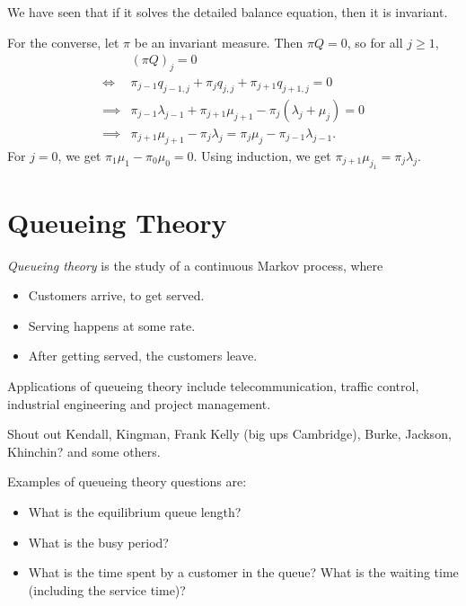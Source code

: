 \documentclass[12pt]{article}
\begin{document}
\begin{proofbox}
	We have seen that if it solves the detailed balance equation, then it is invariant.

	For the converse, let $\pi$ be an invariant measure. Then $\pi Q = 0$, so for all $j \geq 1$,
	\begin{align*}
		&(\pi Q)_j = 0 \\
		\iff&\pi_{j-1}q_{j-1,j} + \pi_jq_{j,j} + \pi_{j+1}q_{j+1,j} = 0 \\
		\implies & \pi_{j-1} \lambda_{j-1} + \pi_{j+1}\mu_{j+1} - \pi_j(\lambda_j + \mu_j) = 0 \\
		\implies &\pi_{j+1}\mu_{j+1} - \pi_j\lambda_j = \pi_j\mu_j - \pi_{j-1}\lambda_{j-1}.
	\end{align*}
	For $j = 0$, we get $\pi_1\mu_1 - \pi_0\mu_0 = 0$. Using induction, we get $\pi_{j+1}\mu_{j_1} = \pi_j\lambda_j$.
\end{proofbox}

\newpage

\section{Queueing Theory}
\label{sec:queueing_theory}

\emph{Queueing theory} is the study of a continuous Markov process, where
\begin{itemize}
	\item Customers arrive, to get served.
	\item Serving happens at some rate.
	\item After getting served, the customers leave.
\end{itemize}

Applications of queueing theory include telecommunication, traffic control, industrial engineering and project management.

Shout out Kendall, Kingman, Frank Kelly (big ups Cambridge), Burke, Jackson, Khinchin? and some others.

Examples of queueing theory questions are:
\begin{itemize}[Q.]
	\item What is the equilibrium queue length?
	\item What is the busy period?
	\item What is the time spent by a customer in the queue? What is the waiting time (including the service time)?
\end{itemize}
\end{document}
